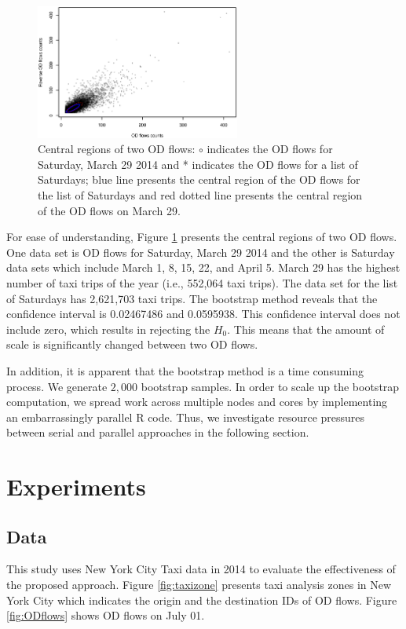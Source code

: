 \documentclass[a4paper,UKenglish]{lipics-v2016}
\begin{document}
\begin{figure}
	\centering
	\includegraphics[width=0.6\textwidth]{images/com_mar_0329.eps}
	\caption{Central regions of two OD flows: $\circ$ indicates the OD flows for Saturday, March 29 2014 and * indicates the OD flows for a list of Saturdays; blue line presents the central region of the OD flows for the list of Saturdays and red dotted line presents the central region of the OD flows on March 29.}
	\label{fig:com_mar_0329}	
\end{figure}

For ease of understanding, Figure \ref{fig:com_mar_0329} presents the central regions of two OD flows. One data set is OD flows for Saturday, March 29 2014 and the other is Saturday data sets which include March  1, 8, 15, 22, and April 5. March 29 has the highest number of taxi trips of the year (i.e., 552,064 taxi trips).  The data set for the list of Saturdays has 2,621,703 taxi trips. The bootstrap method reveals that the confidence interval is 0.02467486 and 0.0595938. This confidence interval does not include zero, which results in rejecting the $H_0$. This means that the amount of scale is significantly changed between two OD flows. 

In addition, it is apparent that the bootstrap method is a time consuming process. We generate $2,000$ bootstrap samples. In order to scale up the bootstrap computation, we spread work across multiple nodes and cores by implementing an embarrassingly parallel R code.  Thus, we investigate resource pressures between serial and parallel approaches in the following section.



\section{Experiments}
\label{sec:experiments}

\subsection{Data}
This study uses New York City Taxi data in 2014 to evaluate the effectiveness of the proposed approach.
Figure \ref{fig:taxizone} presents taxi analysis zones in New York City which indicates the origin and the destination IDs of OD flows. Figure \ref{fig:ODflows} shows OD flows on July 01. 
\end{document}
